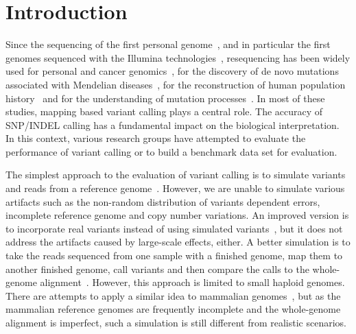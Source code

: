 \documentclass{bioinfo}
\begin{document}
\section{Introduction}

Since the sequencing of the first personal genome~\citep{Levy:2007uq}, and in
particular the first genomes sequenced with the Illumina
technologies~\citep{Bentley:2008cr,Wang:2008nx}, resequencing has been widely
used for personal and cancer genomics~\citep{Watson:2013aa}, for the discovery
of de novo mutations associated with Mendelian diseases~\citep{Bamshad:2011aa},
for the reconstruction of human population history~\citep{Li:2011ij} and for
the understanding of mutation processes~\citep{Veltman:2012aa,Campbell:2013aa}.
In most of these studies, mapping based variant calling plays a central role.
The accuracy of SNP/INDEL calling has a fundamental impact on the biological
interpretation. In this context, various research groups have attempted to
evaluate the performance of variant calling or to build a benchmark data set
for evaluation.

The simplest approach to the evaluation of variant calling is to simulate
variants and reads from a reference genome~\citep{Li:2008zr}. However, we are
unable to simulate various artifacts such as the non-random distribution of
variants dependent errors, incomplete reference genome and copy number
variations. An improved version is to incorporate real variants instead of
using simulated variants~\citep{Talwalkar:2013aa}, but it does not address the
artifacts caused by large-scale effects, either. A better simulation is to take
the reads sequenced from one sample with a finished genome, map them to another
finished genome, call variants and then compare the calls to the whole-genome
alignment~\citep{Li:2008zr}. However, this approach is limited to small haploid
genomes. There are attempts to apply a similar idea to mammalian
genomes~\citep{Li:2013ab,Bolosky:2014aa}, but as the mammalian reference
genomes are frequently incomplete and the whole-genome alignment is imperfect,
such a simulation is still different from realistic scenarios.
\end{document}
